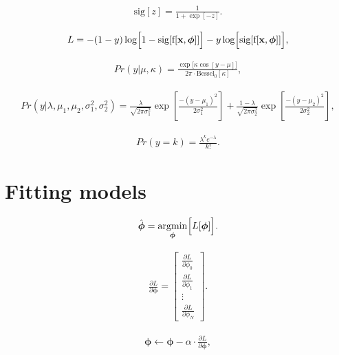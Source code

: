 \documentclass[letterpaper,twoside,openany, titlepage,oldfontcommands,titles,dvipsnames]{memoir}
\begin{document}
\begin{eqnarray}\label{eq:loss_prob_sigmoid}
  \mbox{sig}[z] = \frac{1}{1+\exp[-z]}.
 \end{eqnarray}

\begin{eqnarray}
 L = -(1-y)\log\Bigl[1-\mbox{sig}[\mbox{f}[\mathbf{x},\boldsymbol\phi]]\Bigr] - y\log\Bigl[\mbox{sig}[\mbox{f}[\mathbf{x},\boldsymbol\phi]]\Bigr],
 \end{eqnarray}

\begin{eqnarray}
 Pr(y|\mu,\kappa) = \frac{\exp\bigl[\kappa \cos[y-\mu]\bigr]}{2\pi \cdot \mbox{Bessel}_{0}[\kappa]} , 
 \end{eqnarray}

\begin{eqnarray}
  Pr(y|\lambda,\mu_1,\mu_2,\sigma^2_1,\sigma^2_2) = \frac{\lambda}{\sqrt{2\pi\sigma_1^{2}}}\exp\left[\frac{-(y-\mu_1)^{2}}{2\sigma_1^{2}}\right]+\frac{1-\lambda}{\sqrt{2\pi\sigma_2^{2}}}\exp\left[\frac{-(y-\mu_2)^{2}}{2\sigma_2^{2}}\right],
 \end{eqnarray}

\begin{eqnarray}
  Pr(y=k)=\frac{\lambda^{k}e^{-\lambda}}{k!}. 
 \end{eqnarray}

\chapter{Fitting models}

\begin{eqnarray}
 \hat{\boldsymbol\phi} = \mathop{\rm argmin}_{\boldsymbol\phi}\Bigl[L[\boldsymbol\phi]\Bigr].
 \end{eqnarray}

\begin{eqnarray}
  \frac{\partial L}{\partial \boldsymbol\phi} = \begin{bmatrix}\frac{\partial L}{\partial \phi_{0}} \\[5pt] \frac{\partial L}{\partial \phi_{1}}\\ \vdots \\[5pt] \frac{\partial L}{\partial \phi_{N}}\end{bmatrix}.
 \end{eqnarray}

\begin{eqnarray}\label{eq:train_gradient_descent}
  \boldsymbol\phi\longleftarrow\boldsymbol\phi - \alpha \cdot \frac{\partial L}{\partial \boldsymbol\phi},
  \end{eqnarray}
\end{document}

